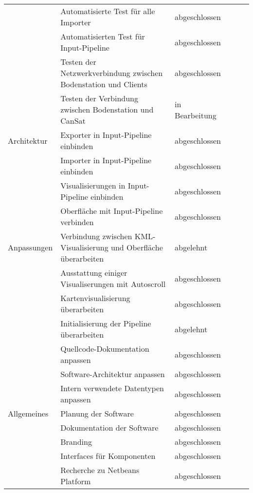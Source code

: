 \begin{table}[H]
\begin{tabular}{p{3cm}p{7cm}p{3cm}rrr}
	& Automatisierte Test für alle Importer & abgeschlossen \\
	& Automatisierten Test für Input-Pipeline & abgeschlossen \\
	& Testen der Netzwerkverbindung zwischen Bodenstation und Clients & abgeschlossen \\
	& Testen der Verbindung zwischen Bodenstation und CanSat & in Bearbeitung \\
	\midrule
	Architektur & Exporter in Input-Pipeline einbinden & abgeschlossen \\
	& Importer in Input-Pipeline einbinden & abgeschlossen \\
	& Visualisierungen in Input-Pipeline einbinden & abgeschlossen \\
	& Oberfläche mit Input-Pipeline verbinden & abgeschlossen \\
	\midrule
	Anpassungen & Verbindung zwischen KML-Visualisierung und Oberfläche überarbeiten & abgelehnt \\
	& Ausstattung einiger Visualiserungen mit Autoscroll & abgeschlossen \\
	& Kartenvisualisierung überarbeiten & abgeschlossen \\
	& Initialisierung der Pipeline überarbeiten & abgelehnt \\
	& Quellcode-Dokumentation anpassen & abgeschlossen \\
	& Software-Architektur anpassen & abgeschlossen \\
	& Intern verwendete Datentypen anpassen & abgeschlossen \\
	\midrule
	Allgemeines & Planung der Software & abgeschlossen \\
	& Dokumentation der Software & abgeschlossen \\
  & Branding & abgeschlossen \\
  & Interfaces für Komponenten & abgeschlossen \\
  & Recherche zu Netbeans Platform & abgeschlossen \\
  \bottomrule
  \bottomrule
 \end{tabular}
 \end{table}

